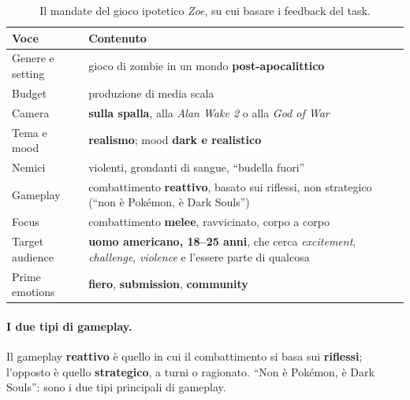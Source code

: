 \begin{table}[htbp]
  \centering
  \caption{Il mandate del gioco ipotetico \emph{Zoe}, su cui basare i
  feedback del task.}
  \label{gd10:tab:zoe}
  \small
  \begin{tabular}{@{}p{}p{}@{}}
    \toprule
    \textbf{Voce} & \textbf{Contenuto} \\
    \midrule
    Genere e setting & gioco di zombie in un mondo
      \textbf{post-apocalittico} \\
    Budget & produzione di media scala\footnotemark \\
    Camera & \textbf{sulla spalla}, alla \emph{Alan Wake 2} o alla
      \emph{God of War} \\
    Tema e mood & \textbf{realismo}; mood \textbf{dark e realistico} \\
    Nemici & violenti, grondanti di sangue, ``budella fuori''\footnotemark \\
    Gameplay & combattimento \textbf{reattivo}, basato sui riflessi, non
      strategico (``non è Pokémon, è Dark Souls'') \\
    Focus & combattimento \textbf{melee}, ravvicinato, corpo a corpo \\
    Target audience & \textbf{uomo americano, 18--25 anni}, che cerca
      \emph{excitement}, \emph{challenge}, \emph{violence} e l'essere
      parte di qualcosa \\
    Prime emotions & \textbf{fiero}, \textbf{submission},
      \textbf{community} \\
    \bottomrule
  \end{tabular}
\end{table}
\addtocounter{footnote}{-1}

\paragraph{I due tipi di gameplay.} Il gameplay \textbf{reattivo} è quello in
cui il combattimento si basa sui \textbf{riflessi}; l'opposto è quello
\textbf{strategico}, a turni o ragionato. ``Non è Pokémon, è Dark Souls'':
sono i due tipi principali di gameplay.

